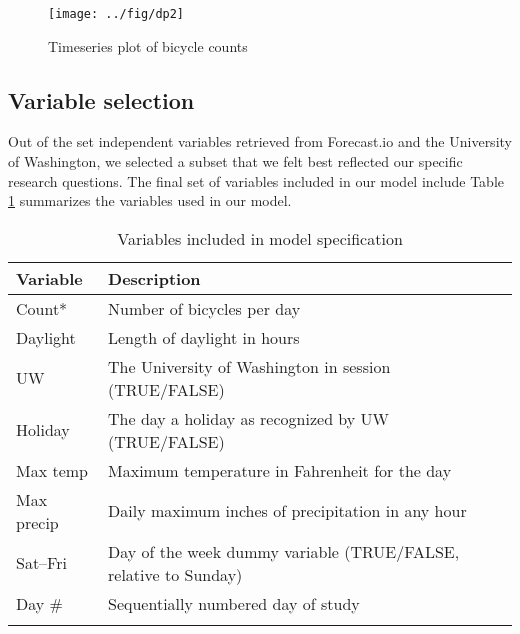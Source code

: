 \documentclass[12pt,letterpaper,article,twocolumn]{memoir}
\begin{document}
\begin{figure}[h!]
  \centering
  \texttt{[image: ../fig/dp2]}
  \caption{Timeseries plot of bicycle counts}
  \label{fg:timeseries}
\end{figure}


\subsection*{Variable selection}
% 
% 

Out of the set independent variables retrieved from Forecast.io and
the University of Washington, we selected a subset that we felt best
reflected our specific research questions. The final set of variables
included in our model include Table \ref{tb:variables} summarizes the
variables used in our model.

\begin{centering}
\begin{table}[ht!]
\begin{scriptsize}
\caption{Variables included in model specification}
\begin{tabularx}{0.47\textwidth}{>{\raggedright\arraybackslash}p{1.6cm}>{\raggedright\arraybackslash}X}
\toprule
Variable & Description \\
\midrule
Count* & Number of bicycles per day \\
Daylight  & Length of daylight in hours \\
UW & The University of Washington in session (TRUE/FALSE) \\
Holiday & The day a holiday as recognized by UW (TRUE/FALSE) \\
Max temp & Maximum temperature in Fahrenheit for the day \\
Max precip & Daily maximum inches of precipitation in any hour \\
Sat--Fri & Day of the week dummy variable (TRUE/FALSE, relative to Sunday) \\
Day \# & Sequentially numbered day of study \\
\bottomrule
\multicolumn{2}{r}{* Dependent variable}
\end{tabularx}

\label{tb:variables}
\end{scriptsize}
\end{table}
\end{centering}
\end{document}
